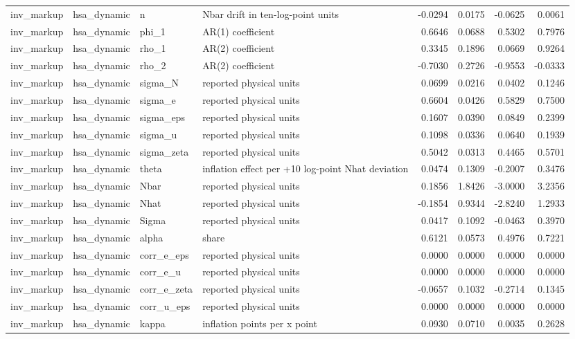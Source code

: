 \begin{tabular}{llllrrrr}
inv\_markup & hsa\_dynamic & n & Nbar drift in ten-log-point units & -0.0294 & 0.0175 & -0.0625 & 0.0061 \\
inv\_markup & hsa\_dynamic & phi\_1 & AR(1) coefficient & 0.6646 & 0.0688 & 0.5302 & 0.7976 \\
inv\_markup & hsa\_dynamic & rho\_1 & AR(2) coefficient & 0.3345 & 0.1896 & 0.0669 & 0.9264 \\
inv\_markup & hsa\_dynamic & rho\_2 & AR(2) coefficient & -0.7030 & 0.2726 & -0.9553 & -0.0333 \\
inv\_markup & hsa\_dynamic & sigma\_N & reported physical units & 0.0699 & 0.0216 & 0.0402 & 0.1246 \\
inv\_markup & hsa\_dynamic & sigma\_e & reported physical units & 0.6604 & 0.0426 & 0.5829 & 0.7500 \\
inv\_markup & hsa\_dynamic & sigma\_eps & reported physical units & 0.1607 & 0.0390 & 0.0849 & 0.2399 \\
inv\_markup & hsa\_dynamic & sigma\_u & reported physical units & 0.1098 & 0.0336 & 0.0640 & 0.1939 \\
inv\_markup & hsa\_dynamic & sigma\_zeta & reported physical units & 0.5042 & 0.0313 & 0.4465 & 0.5701 \\
inv\_markup & hsa\_dynamic & theta & inflation effect per +10 log-point Nhat deviation & 0.0474 & 0.1309 & -0.2007 & 0.3476 \\
inv\_markup & hsa\_dynamic & Nbar & reported physical units & 0.1856 & 1.8426 & -3.0000 & 3.2356 \\
inv\_markup & hsa\_dynamic & Nhat & reported physical units & -0.1854 & 0.9344 & -2.8240 & 1.2933 \\
inv\_markup & hsa\_dynamic & Sigma & reported physical units & 0.0417 & 0.1092 & -0.0463 & 0.3970 \\
inv\_markup & hsa\_dynamic & alpha & share & 0.6121 & 0.0573 & 0.4976 & 0.7221 \\
inv\_markup & hsa\_dynamic & corr\_e\_eps & reported physical units & 0.0000 & 0.0000 & 0.0000 & 0.0000 \\
inv\_markup & hsa\_dynamic & corr\_e\_u & reported physical units & 0.0000 & 0.0000 & 0.0000 & 0.0000 \\
inv\_markup & hsa\_dynamic & corr\_e\_zeta & reported physical units & -0.0657 & 0.1032 & -0.2714 & 0.1345 \\
inv\_markup & hsa\_dynamic & corr\_u\_eps & reported physical units & 0.0000 & 0.0000 & 0.0000 & 0.0000 \\
inv\_markup & hsa\_dynamic & kappa & inflation points per x point & 0.0930 & 0.0710 & 0.0035 & 0.2628 \\

\end{tabular}

